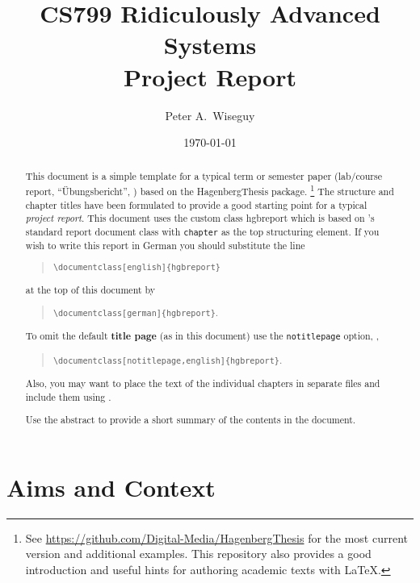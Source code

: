 \documentclass[notitlepage,english]{hgbreport}
\author{Peter A.\ Wiseguy}
\title{CS799 Ridiculously Advanced Systems\\ %
			Project Report}	%
\date{\today}
\begin{document}

\maketitle

\begin{abstract}\noindent
This document is a simple template for a typical term or semester paper (lab/course report, 
``Übungsbericht'', \etc) based on the \textsf{HagenbergThesis} \latex package.%
\footnote{See \url{https://github.com/Digital-Media/HagenbergThesis} for the most current version
and additional examples.
This repository also provides a good introduction and useful hints for authoring academic texts with LaTeX.}
The structure and chapter titles have been formulated to provide a good starting point
for a typical \emph{project report}.
This document uses the custom class \textsf{hgbreport} which is based on \latex's standard \textsf{report} 
document class with \texttt{chapter} as the top structuring element. 
If you wish to write this report in German you should substitute the line
\begin{quote}
	\verb!\documentclass[english]{hgbreport}! 
\end{quote}
at the top of this document by
\begin{quote}
	\verb!\documentclass[german]{hgbreport}!.
\end{quote}
To omit the default \textbf{title page} (as in this document) use the \texttt{notitlepage} option, \eg,
\begin{quote}
	\verb!\documentclass[notitlepage,english]{hgbreport}!.
\end{quote}
Also, you may want to place the text of the individual chapters in separate files and 
include them using \verb!!.

\bigskip
\noindent
Use the abstract to provide a short summary of the contents in the document.
\end{abstract}


\tableofcontents



\chapter{Aims and Context}
\end{document}
